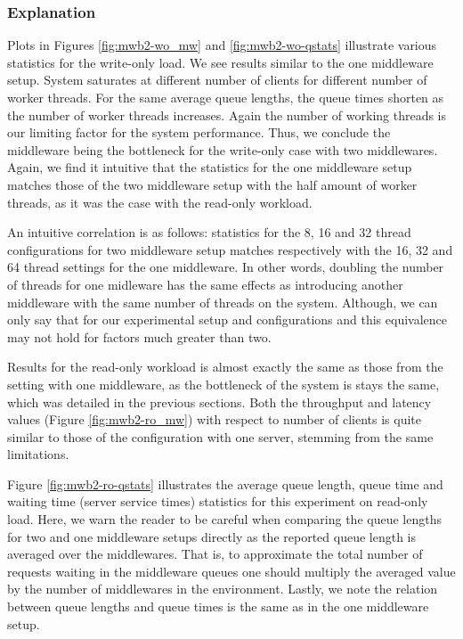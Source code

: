 \documentclass[11pt,a4paper]{article}
\begin{document}
\subsubsection{Explanation} \label{sec:mwb2-exp}
Plots in Figures \ref{fig:mwb2-wo_mw} and \ref{fig:mwb2-wo-qstats} illustrate various statistics for the write-only load. We see results similar to the one middleware setup. System saturates at different number of clients for different number of worker threads. For the same average queue lengths, the queue times shorten as the number of worker threads increases. Again the number of working threads is our limiting factor for the system performance. Thus, we conclude the middleware being the bottleneck for the write-only case with two middlewares. Again, we find it intuitive that the statistics for the one middleware setup matches those of the two middleware setup with the half amount of worker threads, as it was the case with the read-only workload.
\par An intuitive correlation is as follows: statistics for the 8, 16 and 32 thread configurations for two middleware setup matches respectively with the 16, 32 and 64 thread settings for the one middleware. In other words, doubling the number of threads for one midleware has the same effects as introducing another middleware with the same number of threads on the system. Although, we can only say that for our experimental setup and configurations and this equivalence may not hold for factors much greater than two.
\par Results for the read-only workload is almost exactly the same as those from the setting with one middleware, as the bottleneck of the system is stays the same, which was detailed in the previous sections. Both the throughput and latency values (Figure \ref{fig:mwb2-ro_mw}) with respect to number of clients is quite similar to those of the configuration with one server, stemming from the same limitations.
\par Figure \ref{fig:mwb2-ro-qstats} illustrates the average queue length, queue time and waiting time (server service times) statistics for this experiment on read-only load. Here, we warn the reader to be careful when comparing the queue lengths for two and one middleware setups directly as the reported queue length is averaged over the middlewares. That is, to approximate the total number of requests waiting in the middleware queues one should multiply the averaged value by the number of middlewares in the environment. Lastly, we note the relation between queue lengths and queue times is the same as in the one middleware setup.
\end{document}
